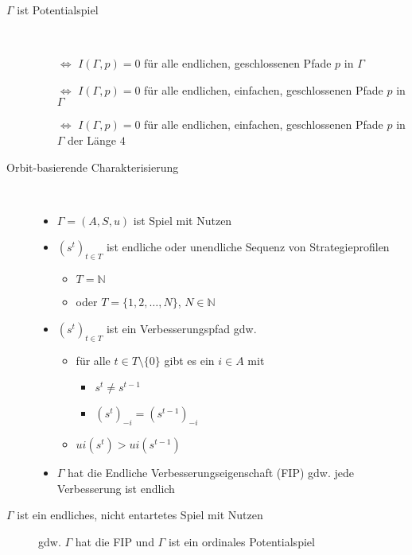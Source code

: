 	\begin{description}
		\item[$\Gamma$ ist Potentialspiel] \ \\\vspace*{-\baselineskip}
			\begin{itemize}
				\item[$\Leftrightarrow$] $I(\Gamma,p)=0$ für alle endlichen, geschlossenen Pfade $p$ in $\Gamma$
				\item[$\Leftrightarrow$] $I(\Gamma,p)=0$ für alle endlichen, einfachen, geschlossenen Pfade $p$ in $\Gamma$
				\item[$\Leftrightarrow$] $I(\Gamma,p)=0$ für alle endlichen, einfachen, geschlossenen Pfade $p$ in $\Gamma$ der Länge $4$
			\end{itemize}
		\item[Orbit-basierende Charakterisierung]\ \\\vspace*{-\baselineskip}
			\begin{itemize}
				\item $\Gamma=(A,S,u)$ ist Spiel mit Nutzen
				\item $(s^t)_{t\in T}$ ist endliche oder unendliche Sequenz von Strategieprofilen
					\begin{itemize}
						\item $T=\mathbb{N}$
						\item oder $T=\{1,2,\dots,N\}$, $N\in \mathbb{N}$
					\end{itemize}
				\item $(s^t)_{t\in T}$ ist ein Verbesserungspfad gdw. 
					\begin{itemize}
						\item für alle $t\in T\setminus\{0\}$ gibt es ein $i\in A$ mit
							\begin{itemize}
								\item $s^t\neq s^{t-1}$
								\item $(s^t)_{-i}=(s^{t-1})_{-i}$
							\end{itemize}
						\item $ui(s^t)>ui(s^{t-1})$
					\end{itemize}
				\item $\Gamma$ hat die Endliche Verbesserungseigenschaft (FIP) gdw. jede Verbesserung ist endlich
			\end{itemize}
		\item[$\Gamma$ ist ein endliches, nicht entartetes Spiel mit Nutzen] gdw. $\Gamma$ hat die FIP und $\Gamma$ ist ein ordinales Potentialspiel
	\end{description}
